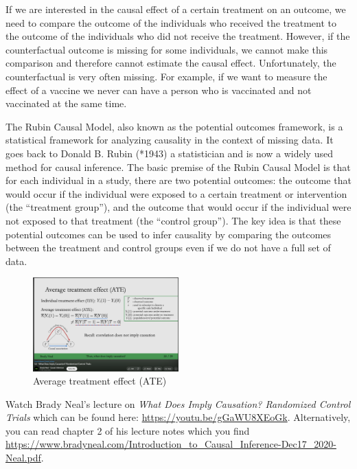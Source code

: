 \documentclass[
  12pt,
  oneside]{book}
\theoremstyle{definition}
\theoremstyle{definition}
\theoremstyle{definition}
\theoremstyle{definition}
\theoremstyle{remark}
\begin{document}
If we are interested in the causal effect of a certain treatment on an outcome, we need to compare the outcome of the individuals who received the treatment to the outcome of the individuals who did not receive the treatment. However, if the counterfactual outcome is missing for some individuals, we cannot make this comparison and therefore cannot estimate the causal effect. Unfortunately, the counterfactual is very often missing. For example, if we want to measure the effect of a vaccine we never can have a person who is vaccinated and not vaccinated at the same time.

The Rubin Causal Model, also known as the potential outcomes framework, is a statistical framework for analyzing causality in the context of missing data. It goes back to Donald B. Rubin (*1943) a statistician and is now a widely used method for causal inference. The basic premise of the Rubin Causal Model is that for each individual in a study, there are two potential outcomes: the outcome that would occur if the individual were exposed to a certain treatment or intervention (the ``treatment group''), and the outcome that would occur if the individual were not exposed to that treatment (the ``control group''). The key idea is that these potential outcomes can be used to infer causality by comparing the outcomes between the treatment and control groups even if we do not have a full set of data.

\begin{figure}
\centering
\includegraphics[width=0.5\textwidth,height=\textheight]{fig/neal-rct.png}
\caption[\label{fig:nealrct} Average treatment effect (ATE)]{\label{fig:nealrct} Average treatment effect (ATE)\footnotemark{}}
\end{figure}

Watch Brady Neal's lecture on \emph{What Does Imply Causation? Randomized Control Trials} which can be found here: \url{https://youtu.be/gGaWU8XEoGk}. Alternatively, you can read chapter 2 of his lecture notes \citep{Neal2020Introduction} which you find \url{https://www.bradyneal.com/Introduction_to_Causal_Inference-Dec17_2020-Neal.pdf}.
\end{document}
